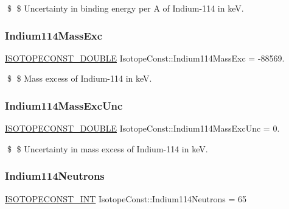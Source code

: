 \$ \$ Uncertainty in binding energy per A of Indium-\/114 in keV. \mbox{\label{group___isotope_const-_indium-_in114_gaac4219dadf372e922250af01a0a07a3f}} 
\subsubsection{\texorpdfstring{Indium114\+Mass\+Exc}{Indium114MassExc}}
{\footnotesize\ttfamily \mbox{\hyperlink{group___isotope_const-_macros_ga8f45a7272ce02c0b4c65c44636ed719a}{I\+S\+O\+T\+O\+P\+E\+C\+O\+N\+S\+T\+\_\+\+D\+O\+U\+B\+LE}} Isotope\+Const\+::\+Indium114\+Mass\+Exc = -\/88569.}

\$ \$ Mass excess of Indium-\/114 in keV. \mbox{\label{group___isotope_const-_indium-_in114_ga98b4c570a96e065a4a5c1f398226f260}} 
\subsubsection{\texorpdfstring{Indium114\+Mass\+Exc\+Unc}{Indium114MassExcUnc}}
{\footnotesize\ttfamily \mbox{\hyperlink{group___isotope_const-_macros_ga8f45a7272ce02c0b4c65c44636ed719a}{I\+S\+O\+T\+O\+P\+E\+C\+O\+N\+S\+T\+\_\+\+D\+O\+U\+B\+LE}} Isotope\+Const\+::\+Indium114\+Mass\+Exc\+Unc = 0.}

\$ \$ Uncertainty in mass excess of Indium-\/114 in keV. \mbox{\label{group___isotope_const-_indium-_in114_ga2830421dcc9dc11bc365dfbfe020a01f}} 
\subsubsection{\texorpdfstring{Indium114\+Neutrons}{Indium114Neutrons}}
{\footnotesize\ttfamily \mbox{\hyperlink{group___isotope_const-_macros_ga5f18360b3e99483a35c32d789e62621c}{I\+S\+O\+T\+O\+P\+E\+C\+O\+N\+S\+T\+\_\+\+I\+NT}} Isotope\+Const\+::\+Indium114\+Neutrons = 65}

